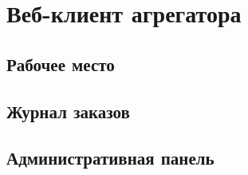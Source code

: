 \section{Веб-клиент агрегатора}

	\subsection{Рабочее место}

	\subsection{Журнал заказов}

	\subsection{Административная панель}